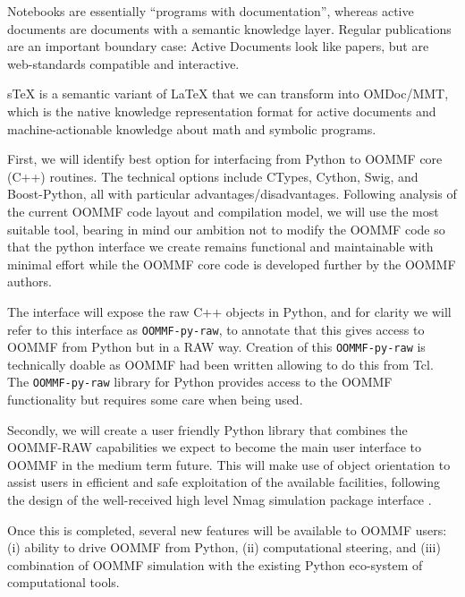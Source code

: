 \begin{workpackage}
\begin{tasklist}
\begin{task}[title=Structured documents,id=structdocs]
  Notebooks are essentially ``programs with documentation'', whereas active documents are
  documents with a semantic knowledge layer. Regular publications are an important
  boundary case: Active Documents look like papers, but are web-standards compatible and
  interactive.

  sTeX is a semantic variant of LaTeX that we can transform into OMDoc/MMT, which is the
  native knowledge representation format for active documents and machine-actionable
  knowledge about math and symbolic programs.
\end{task}

\begin{task}[lead=USO,id=oommf-python-interface,title=OOMMF case study: Create Python interface to OOMMF code,PM=6]

  First, we will identify best option for interfacing from Python to OOMMF
  core (C++) routines. The technical options include CTypes, Cython, Swig,
  and Boost-Python, all with particular
  advantages/disadvantages. Following analysis of the current OOMMF
  code layout and compilation model, we will use the most suitable
  tool, bearing in mind our ambition not to modify the OOMMF code so
  that the python interface we create remains functional and
  maintainable with minimal effort while the OOMMF core code is
  developed further by the OOMMF authors.

  The interface will expose the raw C++ objects in Python, and for
  clarity we will refer to this interface as \texttt{OOMMF-py-raw}, to
  annotate that this gives access to OOMMF from Python but in a RAW
  way. Creation of this \texttt{OOMMF-py-raw} is technically doable as
  OOMMF had been written allowing to do this from Tcl. The
  \texttt{OOMMF-py-raw} library for Python provides access to the
  OOMMF functionality but requires some care when being used.

  Secondly, we will create a user friendly Python library that
  combines the OOMMF-RAW capabilities we expect to become the main
  user interface to OOMMF in the medium term future. This will make
  use of object orientation to assist users in efficient and safe
  exploitation of the available facilities, following the design of
  the well-received high level Nmag simulation package
  \cite{Fischbacher2007a} interface \cite{Nmag-url}.

  Once this is completed, several new features will be available to
  OOMMF users: (i) ability to drive OOMMF from Python, (ii)
  computational steering, and (iii) combination of OOMMF simulation
  with the existing Python eco-system of computational tools.


\end{task}
\end{tasklist}
\end{workpackage}
